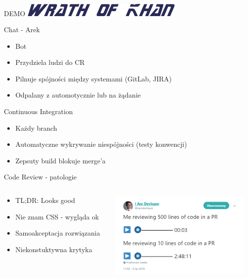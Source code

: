 \documentclass[ignorenonframetext]{beamer}
\begin{document}
\begin{frame}{DEMO}
	\centering
	\includegraphics[width=8cm]{images/wrath-of-khan.png}
\end{frame}

\begin{frame}{Chat - Arek}
\begin{itemize}
	\item Bot 
	\item Przydziela ludzi do CR
	\item Pilnuje spójności między systemami (GitLab, JIRA)
	\item Odpalany z automotycznie lub na żądanie
\end{itemize}
\end{frame}

\begin{frame}{Continuous Integration}
\begin{itemize}
	\item Każdy branch
	\item Automatyczne wykrywanie niespójności (testy konwencji)
	\item Zepsuty build blokuje merge'a
\end{itemize}
\end{frame}

\begin{frame}{Code Review - patologie}
\begin{columns}
	\begin{column}{0.45\textwidth}
		\begin{itemize}
			\item TL;DR: Looks good
			\item Nie znam CSS - wygląda ok
			\item Samoakceptacja rozwiązania
			\item Niekonstuktywna krytyka
		\end{itemize}
	\end{column}
	\begin{column}{0.55\textwidth}
		\includegraphics[width=7cm]{images/cr500lines.png}
	\end{column}
\end{columns}
\end{frame}
\end{document}
